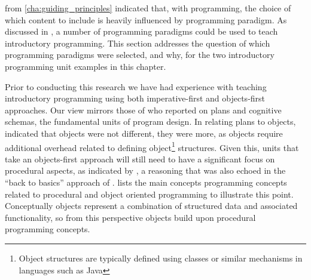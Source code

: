  from \cref{cha:guiding_principles} indicated that, with programming, the choice of which content to include is heavily influenced by programming paradigm. As discussed in , a number of programming paradigms could be used to teach introductory programming. This section addresses the question of which programming paradigms were selected, and why, for the two introductory programming unit examples in this chapter.

%

Prior to conducting this research we have had experience with teaching introductory programming using both imperative-first and objects-first approaches. Our view mirrors those of \citet{Rist:1996} who reported on plans and cognitive schemas, the fundamental units of program design. In relating plans to objects, \citet{Rist:1996} indicated that objects were not different, they were more, as objects require additional overhead related to defining object\footnote{Object structures are typically defined using classes or similar mechanisms in languages such as Java} structures. Given this, units that take an objects-first approach will still need to have a significant focus on procedural aspects, as indicated by \citet{Robins:2003}, a reasoning that was also echoed in the ``back to basics'' approach of \citet{Reges:2006}.  lists the main concepts programming concepts related to procedural and object oriented programming to illustrate this point. Conceptually objects represent a combination of structured data and associated functionality, so from this perspective objects build upon procedural programming concepts.

